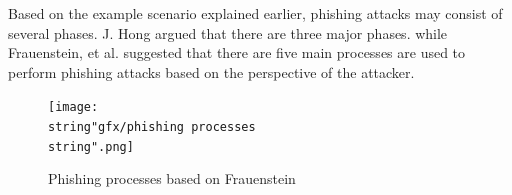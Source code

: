 Based on the example scenario explained earlier, phishing attacks
may consist of several phases. J. Hong \citep{hong:2012} argued that
there are three major phases. while Frauenstein, et al. \citep{frauenstein:2013}
suggested that there are five main processes are used to perform phishing
attacks based on the perspective of the attacker.

\begin{figure}
\begin{centering}
\texttt{[image: \\string"gfx/phishing processes\\string".png]}
\par\end{centering}

\protect\caption{\label{fig:frauenstein}Phishing processes based on Frauenstein\citep{frauenstein:2013}}
\end{figure}


